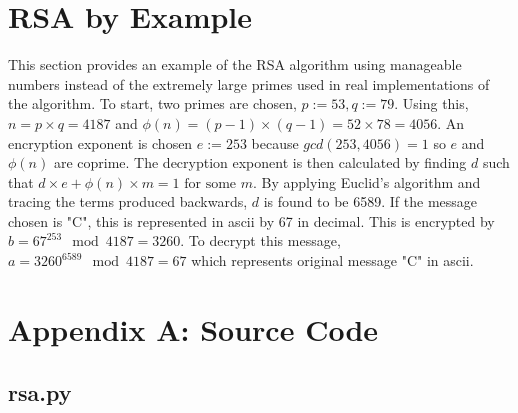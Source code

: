\documentclass{article}
\begin{document}
	\section{RSA by Example}
		This section provides an example of the RSA algorithm using manageable numbers instead of the extremely large primes used in real implementations of the algorithm. To start, two primes are chosen, $ p := 53, q := 79 $. Using this, $ n = p \times q = 4187 $ and $ \phi(n) = (p-1) \times (q-1) = 52 \times 78 = 4056 $. An encryption exponent is chosen $ e := 253 $ because $ gcd(253, 4056) = 1 $ so $e$ and $\phi(n)$ are coprime. The decryption exponent is then calculated by finding $d$ such that $ d \times e + \phi(n) \times m = 1 \text{ for some } m $. By applying Euclid's algorithm and tracing the terms produced backwards, $d$ is found to be 6589. If the message chosen is "C", this is represented in ascii by 67 in decimal. This is encrypted by $ b = 67^{253} \mod 4187 = 3260 $. To decrypt this message, $ a = 3260^{6589} \mod 4187 = 67 $ which represents original message "C" in ascii.
		 
	\newpage
	
	\section{Appendix A: Source Code}
	
	\subsection{rsa.py}
		
	
\end{document}
